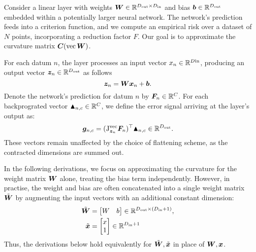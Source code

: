 \begin{setup}\label{setup:linear_layer}
  Consider a linear layer with weights ${\bm{W}} \in {\mathbb{R}}^{D_{\text{out}}\times D_{\text{in}}}$ and bias ${\bm{b}} \in {\mathbb{R}}^{D_{\text{out}}}$ embedded within a potentially larger neural network.
  The network's prediction feeds into a criterion function, and we compute an empirical risk over a dataset of $N$ points, incorporating a reduction factor $F$.
  Our goal is to approximate the curvature matrix ${\bm{C}}(\operatorname{vec} {\bm{W}})$.

  For each datum $n$, the layer processes an input vector $x_n \in {\mathbb{R}}^{D {\text{in}}}$, producing an output vector ${\bm{z}}_{n} \in {\mathbb{R}}^{D_{\text{out}}}$ as follows 
  $$ {\bm{z}}_{n} = {\bm{W}} {\bm{x}}_{n} + {\bm{b}}.$$
  Denote the network's prediction for datum $n$ by ${\bm{F}}_n \in {\mathbb{R}}^{C}$. 
  For each backprograted vector $\blacktriangle_{n,c} \in {\mathbb{R}}^{C}$, we define the error signal arriving at the layer's output as: 
  $${\bm{g}}_{n,c} = (\mathrm{J}^{\operatorname{vec}}_{{\bm{z}}_{n}} {\bm{F}}_n)^{\top} \blacktriangle_{n,c} \in {\mathbb{R}}^{D_{\text{out}}}.$$ 
  These vectors remain unaffected by the choice of flattening scheme, as the contracted dimensions are summed out.

  In the following derivations, we focus on approximating the curvature for the weight matrix ${\bm{W}}$ alone, treating the bias term independently.
  However, in practise, the weight and bias are often concatenated into a single weight matrix $\tilde{{\bm{W}}}$ by augmenting the input vectors with an additional constant dimension:
  \begin{align*}
    \tilde{{\bm{W}}} &= \begin{bmatrix} W & b \end{bmatrix} \in {\mathbb{R}}^{D_{\text{out}} \times (D_{\text{in}} + 1)}, \\
    \tilde{{\bm{x}}} &= \begin{bmatrix} x \\ 1 \end{bmatrix} \in {\mathbb{R}}^{D_{\text{in}} + 1}
  \end{align*}
  Thus, the derivations below hold equivalently for $\tilde{{\bm{W}}}, \tilde{{\bm{x}}}$ in place of ${\bm{W}}, {\bm{x}}$. 
\end{setup}

